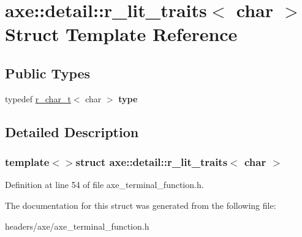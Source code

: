 \hypertarget{structaxe_1_1detail_1_1r__lit__traits_3_01char_01_4}{\section{axe\+:\+:detail\+:\+:r\+\_\+lit\+\_\+traits$<$ char $>$ Struct Template Reference}
\label{structaxe_1_1detail_1_1r__lit__traits_3_01char_01_4}
}
\subsection*{Public Types}
\begin{DoxyCompactItemize}
\item 
\hypertarget{structaxe_1_1detail_1_1r__lit__traits_3_01char_01_4_a6a7d3554f4f9f915bd338beee43ae936}{typedef \hyperlink{classaxe_1_1r__char__t}{r\+\_\+char\+\_\+t}$<$ char $>$ {\bfseries type}}\label{structaxe_1_1detail_1_1r__lit__traits_3_01char_01_4_a6a7d3554f4f9f915bd338beee43ae936}

\end{DoxyCompactItemize}


\subsection{Detailed Description}
\subsubsection*{template$<$$>$struct axe\+::detail\+::r\+\_\+lit\+\_\+traits$<$ char $>$}



Definition at line 54 of file axe\+\_\+terminal\+\_\+function.\+h.



The documentation for this struct was generated from the following file\+:\begin{DoxyCompactItemize}
\item 
headers/axe/axe\+\_\+terminal\+\_\+function.\+h\end{DoxyCompactItemize}
